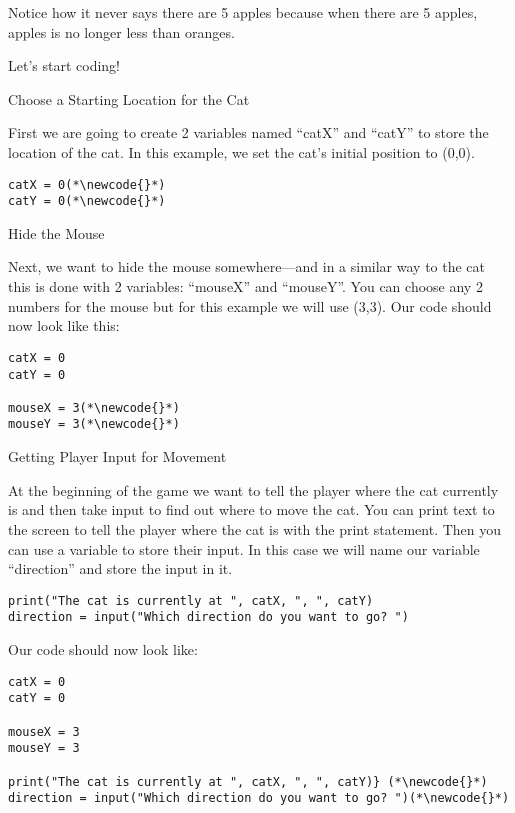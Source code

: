 \documentclass[12pt,oneside]{article}
\newcommand{\q}[1]{``#1''}
\newcommand{\subsectitle}[1]{
  \begin{flushleft}{\large#1}\end{flushleft}
}
\newcommand{\sectitle}[1]{
  \newpage
  \begin{flushleft}{\huge#1}\end{flushleft}
}
\newcommand{\newcode}[0]{\hfill<--}
\begin{document}
Notice how it never says there are 5 apples because when there are 5 apples, apples is no longer less than oranges.

\sectitle{Let's start coding!}

\begin{minipage}{\textwidth}
\subsectitle{Choose a Starting Location for the Cat}

First we are going to create 2 variables named \q{catX} and \q{catY} to store the location of the cat. In this example, we set the cat's initial position to (0,0).

\begin{lstlisting}
catX = 0(*\newcode{}*)
catY = 0(*\newcode{}*)
\end{lstlisting}
\end{minipage}

\begin{minipage}{\textwidth}
\subsectitle{Hide the Mouse}

Next, we want to hide the mouse somewhere---and in a similar way to the cat this is done with 2 variables: \q{mouseX} and \q{mouseY}. You can choose any 2 numbers for the mouse but for this example we will use (3,3). Our code should now look like this:

\begin{lstlisting}
catX = 0
catY = 0

mouseX = 3(*\newcode{}*)
mouseY = 3(*\newcode{}*)
\end{lstlisting}
\end{minipage}


\begin{minipage}{\textwidth}
\subsectitle{Getting Player Input for Movement}

At the beginning of the game we want to tell the player where the cat currently is and then take input to find out where to move the cat. You can print text to the screen to tell the player where the cat is with the print statement. Then you can use a variable to store their input. In this case we will name our variable \q{direction} and store the input in it.

\begin{lstlisting}
print("The cat is currently at ", catX, ", ", catY)
direction = input("Which direction do you want to go? ")
\end{lstlisting}

Our code should now look like:

\begin{lstlisting}
catX = 0
catY = 0

mouseX = 3
mouseY = 3

print("The cat is currently at ", catX, ", ", catY)} (*\newcode{}*)
direction = input("Which direction do you want to go? ")(*\newcode{}*)
\end{lstlisting}
\end{minipage}
\end{document}
